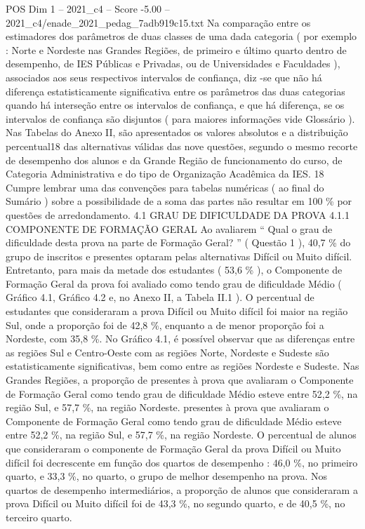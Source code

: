\begin{textsample}{POS Dim 1 – 2021\_c4 – Score -5.00 – 2021\_c4/enade\_2021\_pedag\_7adb919c15.txt}
Na comparação entre os estimadores dos parâmetros de duas classes de uma dada categoria ( por exemplo : Norte e Nordeste nas Grandes Regiões, de primeiro e último quarto dentro de desempenho, de IES Públicas e Privadas, ou de Universidades e Faculdades ), associados aos seus respectivos intervalos de confiança, diz -se que não há diferença estatisticamente significativa entre os parâmetros das duas categorias quando há interseção entre os intervalos de confiança, e que há diferença, se os intervalos de confiança são disjuntos ( para maiores informações vide Glossário ).
Nas Tabelas do Anexo II, são apresentados os valores absolutos e a distribuição percentual18 das alternativas válidas das nove questões, segundo o mesmo recorte de desempenho dos alunos e da Grande Região de funcionamento do curso, de Categoria Administrativa e do tipo de Organização Acadêmica da IES. 18 Cumpre lembrar uma das convenções para tabelas numéricas ( ao final do Sumário ) sobre a possibilidade de a soma das partes não resultar em 100 \% por questões de arredondamento. 4.1 GRAU DE DIFICULDADE DA PROVA 4.1.1 COMPONENTE DE FORMAÇÃO GERAL Ao avaliarem “ Qual o grau de dificuldade desta prova na parte de Formação Geral? ” ( Questão 1 ), 40,7 \% do grupo de inscritos e presentes optaram pelas alternativas Difícil ou Muito difícil.
Entretanto, para mais da metade dos estudantes ( 53,6 \% ), o Componente de Formação Geral da prova foi avaliado como tendo grau de dificuldade Médio ( Gráfico 4.1, Gráfico 4.2 e, no Anexo II, a Tabela II.1 ).
O percentual de estudantes que consideraram a prova Difícil ou Muito difícil foi maior na região Sul, onde a proporção foi de 42,8 \%, enquanto a de menor proporção foi a Nordeste, com 35,8 \%.
No Gráfico 4.1, é possível observar que as diferenças entre as regiões Sul e Centro-Oeste com as regiões Norte, Nordeste e Sudeste são estatisticamente significativas, bem como entre as regiões Nordeste e Sudeste.
Nas Grandes Regiões, a proporção de presentes à prova que avaliaram o Componente de Formação Geral como tendo grau de dificuldade Médio esteve entre 52,2 \%, na região Sul, e 57,7 \%, na região Nordeste. presentes à prova que avaliaram o Componente de Formação Geral como tendo grau de dificuldade Médio esteve entre 52,2 \%, na região Sul, e 57,7 \%, na região Nordeste.
O percentual de alunos que consideraram o componente de Formação Geral da prova Difícil ou Muito difícil foi decrescente em função dos quartos de desempenho : 46,0 \%, no primeiro quarto, e 33,3 \%, no quarto, o grupo de melhor desempenho na prova.
Nos quartos de desempenho intermediários, a proporção de alunos que consideraram a prova Difícil ou Muito difícil foi de 43,3 \%, no segundo quarto, e de 40,5 \%, no terceiro quarto.

\end{textsample}
